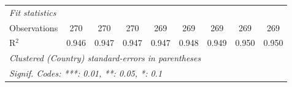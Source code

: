\begin{table}[htbp]
\begin{tabular}{lcccccccc}
      \midrule \emph{Fit statistics}\\
      Observations                            & 270            & 270            & 270     & 269     & 269     & 269     & 269     & 269\\  
      R$^2$                                   & 0.946          & 0.947          & 0.947   & 0.947   & 0.948   & 0.949   & 0.950   & 0.950\\  
      \midrule
      \multicolumn{9}{l}{\emph{Clustered (Country) standard-errors in parentheses}}\\
      \multicolumn{9}{l}{\emph{Signif. Codes: ***: 0.01, **: 0.05, *: 0.1}}\\
   \end{tabular}
\end{table}


